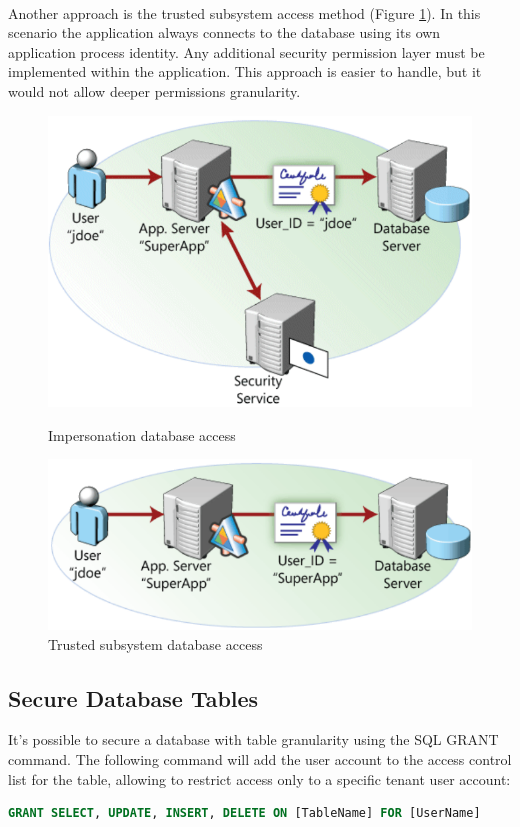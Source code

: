 \documentclass[11pt,english]{article} %
\begin{document}
\

Another approach is the trusted subsystem access method (Figure \ref{fig:trusted-subsystem-database-access}).
In this scenario the application always connects to the database using its own application process identity.
Any additional security permission layer must be implemented within the application.
This approach is easier to handle, but it would not allow deeper permissions granularity.

\begin{figure}[h]
    \centering
    \begin{minipage}[t]{.5\textwidth}
      \centering
      \includegraphics[width=0.75\linewidth]{img/impersonation-database-access.png}
      \caption{Impersonation database access
      \label{fig:impersonation-database-access}}
    \end{minipage}%
    \begin{minipage}[t]{.5\textwidth}
      \centering
      \includegraphics[width=1\linewidth]{img/trusted-subsystem-database-access.png}
      \caption{Trusted subsystem database access \label{fig:trusted-subsystem-database-access}}
    \end{minipage}
\end{figure}


\subsection{Secure Database Tables}
It's possible to secure a database with table granularity using the SQL GRANT command.
The following command will add the user account to the access control list for the table, allowing to restrict access only to a specific tenant user account:
\begin{lstlisting}[language=sql,numbers=none]
GRANT SELECT, UPDATE, INSERT, DELETE ON [TableName] FOR [UserName]
\end{lstlisting}
\end{document}
